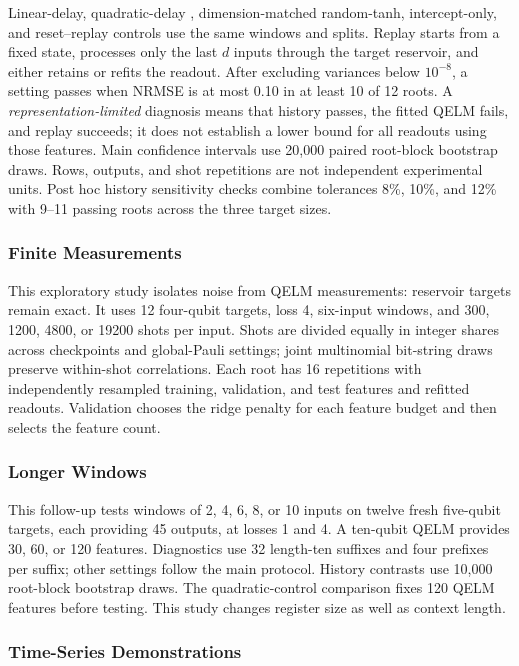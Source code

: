 Linear-delay, quadratic-delay
\cite{gauthier2021next}, dimension-matched random-tanh, intercept-only,
and reset--replay controls use the same windows and splits. Replay starts
from a fixed state, processes only the last $d$ inputs through the target
reservoir, and either retains or refits the readout. After excluding
variances below $10^{-8}$, a setting passes
when NRMSE is at most 0.10 in at least 10 of 12 roots. A
\emph{representation-limited} diagnosis means that history passes, the
fitted QELM fails, and replay succeeds; it does not establish a lower
bound for all readouts using those features. Main confidence intervals
use 20,000 paired root-block bootstrap draws. Rows, outputs, and shot
repetitions are not independent experimental units.
Post hoc history sensitivity checks combine tolerances 8\%, 10\%, and
12\% with 9--11 passing roots across the three target sizes.

\subsubsection{Finite Measurements}

This exploratory study isolates noise from QELM measurements: reservoir
targets remain exact. It uses 12 four-qubit targets, loss 4, six-input
windows, and 300, 1200, 4800, or 19200 shots per input.
Shots are divided equally in integer shares across checkpoints and
global-Pauli settings; joint multinomial bit-string draws preserve
within-shot correlations. Each root has 16 repetitions with independently
resampled training, validation, and test features and refitted readouts.
Validation chooses the ridge penalty for each feature budget and then
selects the feature count.

\subsubsection{Longer Windows}

This follow-up tests windows of 2, 4, 6, 8, or 10 inputs on twelve fresh
five-qubit targets, each providing 45 outputs, at losses 1 and 4.
A ten-qubit QELM provides 30, 60, or 120 features. Diagnostics use 32 length-ten
suffixes and four prefixes per suffix; other settings follow the main
protocol. History contrasts use 10,000 root-block bootstrap draws.
The quadratic-control comparison fixes 120 QELM features before testing.
This study changes register size as well as context length.

\subsubsection{Time-Series Demonstrations}
\label{app:laser-demonstration}

